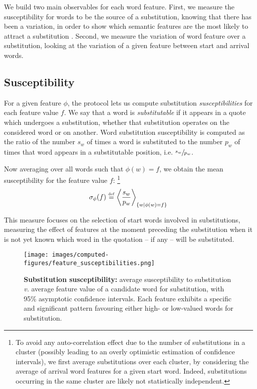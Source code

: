 We build two main observables for each word feature.
First, we measure the susceptibility for words to be the source of a substitution, knowing that there has been a variation, in order to show which semantic features are the most likely to attract a substitution .
Second, we measure the variation of word feature over a substitution, looking at the variation of a given feature between start and arrival words.

\subsection{Susceptibility}

For a given feature $\phi$, the protocol lets us compute substitution \emph{susceptibilities} for each feature value $f$.
We say that a word is \emph{substitutable} if it appears in a quote which undergoes a substitution, whether that substitution operates on the considered word or on another.
Word substitution susceptibility is computed as the ratio of the number $s_w$ of times a word is substituted to the number $p_w$ of times that word appears in a substitutable position, i.e. $\sfrac{s_w}{p_w}$.

Now averaging over all words such that $\phi(w) = f$, we obtain the mean susceptibility for the feature value $f$:
\footnote{To avoid any auto-correlation effect due to the number of substitutions in a cluster (possibly leading to an overly optimistic estimation of confidence intervals), we first average substitutions over each cluster, by considering the average of arrival word features for a given start word.
Indeed, substitutions occurring in the same cluster are likely not statistically independent.}
$$\sigma_{\phi}(f) \overset{\underset{\mathrm{def}}{}}{=} \left< \frac{s_w}{p_w} \right>_{\left\lbrace w | \phi(w) = f \right\rbrace}$$

This measure focuses on the selection of start words involved in substitutions, measuring the effect of features at the moment preceding the substitution when it is not yet known which word in the quotation -- if any -- will be substituted.

\begin{figure*}[!th]
    \centering
    \texttt{[image: images/computed-figures/feature\_susceptibilities.png]}
    \caption{\textbf{Substitution susceptibility:} average susceptibility to substitution \emph{v.} average feature value of a candidate word for substitution, with 95\% asymptotic confidence intervals.
    Each feature exhibits a specific and significant pattern favouring either high- or low-valued words for substitution.}
    \label{fig:feature-susceptibilities}
\end{figure*}


